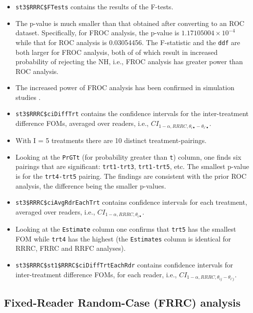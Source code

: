 \documentclass[
]{book}
\begin{document}
\begin{itemize}
\item
  \texttt{st3\$RRRC\$FTests} contains the results of the F-tests.
\item
  The p-value is much smaller than that obtained after converting to an ROC dataset. Specifically, for FROC analysis, the p-value is \ensuremath{1.17105004\times 10^{-4}} while that for ROC analysis is 0.03054456. The F-statistic and the \texttt{ddf} are both larger for FROC analysis, both of of which result in increased probability of rejecting the NH, i.e., FROC analysis has greater power than ROC analysis.
\item
  The increased power of FROC analysis has been confirmed in simulation studies \citep{RN1331}.
\item
  \texttt{st3\$RRRC\$ciDiffTrt} contains the confidence intervals for the inter-treatment difference FOMs, averaged over readers, i.e., \(CI_{1-\alpha,RRRC,\theta_{i \bullet} - \theta_{i' \bullet}}\).
\item
  With I = 5 treatments there are 10 distinct treatment-pairings.
\item
  Looking at the \texttt{PrGTt} (for probability greater than \texttt{t}) column, one finds six pairings that are significant: \texttt{trt1-trt3}, \texttt{trt1-trt5}, etc. The smallest p-value is for the \texttt{trt4-trt5} pairing. The findings are consistent with the prior ROC analysis, the difference being the smaller p-values.
\item
  \texttt{st3\$RRRC\$ciAvgRdrEachTrt} contains confidence intervals for each treatment, averaged over readers, i.e., \(CI_{1-\alpha,RRRC,\theta_{i \bullet}}\).
\item
  Looking at the \texttt{Estimate} column one confirms that \texttt{trt5} has the smallest FOM while \texttt{trt4} has the highest (the \texttt{Estimates} column is identical for RRRC, FRRC and RRFC analyses).
\item
  \texttt{st3\$RRRC\$st1\$RRRC\$ciDiffTrtEachRdr} contains confidence intervals for inter-treatment difference FOMs, for each reader, i.e., \(CI_{1-\alpha,RRRC,\theta_{i j} - \theta_{i' j}}\).
\end{itemize}

\hypertarget{ORApplications-FRRC-dataset04-FROC}{%
\subsection{Fixed-Reader Random-Case (FRRC) analysis}\label{ORApplications-FRRC-dataset04-FROC}}
\end{document}
